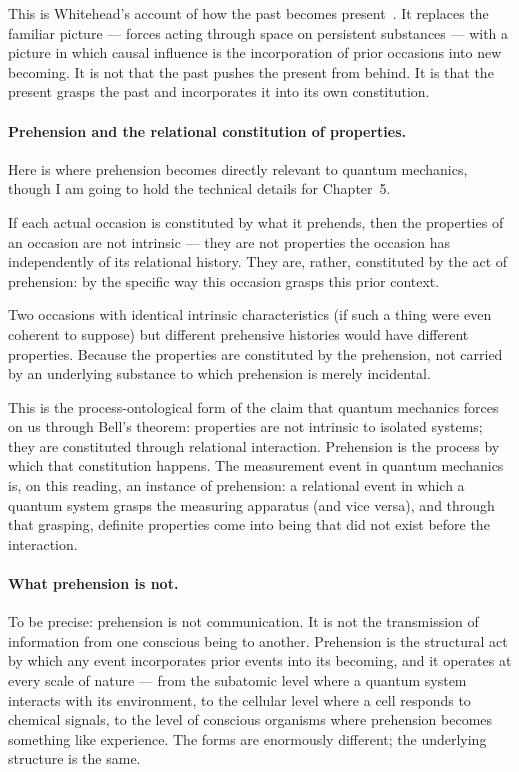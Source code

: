This is Whitehead's account of how the past becomes present~\citeyearpar{Whitehead1929}.
It replaces the familiar picture --- forces acting through space on persistent
substances --- with a picture in which causal influence is the incorporation
of prior occasions into new becoming.
It is not that the past pushes the present from behind.
It is that the present grasps the past and incorporates it into its own
constitution.

\paragraph{Prehension and the relational constitution of properties.}

Here is where prehension becomes directly relevant to quantum mechanics,
though I am going to hold the technical details for Chapter~5.

If each actual occasion is constituted by what it prehends, then the
properties of an occasion are not intrinsic --- they are not properties the
occasion has independently of its relational history.
They are, rather, constituted by the act of prehension: by the specific way
this occasion grasps this prior context.

Two occasions with identical intrinsic characteristics (if such a thing
were even coherent to suppose) but different prehensive histories would have
different properties.
Because the properties are constituted by the prehension, not carried by
an underlying substance to which prehension is merely incidental.

This is the process-ontological form of the claim that quantum mechanics
forces on us through Bell's theorem: properties are not intrinsic to isolated
systems; they are constituted through relational interaction.
Prehension is the process by which that constitution happens.
The measurement event in quantum mechanics is, on this reading, an instance
of prehension: a relational event in which a quantum system grasps the
measuring apparatus (and vice versa), and through that grasping, definite
properties come into being that did not exist before the interaction.

\paragraph{What prehension is not.}

To be precise: prehension is not communication.
It is not the transmission of information from one conscious being to another.
Prehension is the structural act by which any event incorporates prior events
into its becoming, and it operates at every scale of nature --- from the
subatomic level where a quantum system interacts with its environment,
to the cellular level where a cell responds to chemical signals,
to the level of conscious organisms where prehension becomes something
like experience.
The forms are enormously different; the underlying structure is the same.

